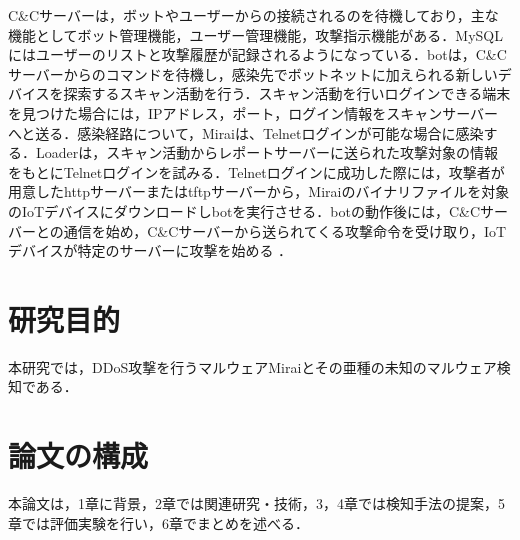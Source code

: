C\&Cサーバーは，ボットやユーザーからの接続されるのを待機しており，主な機能としてボット管理機能，ユーザー管理機能，攻撃指示機能がある．MySQLにはユーザーのリストと攻撃履歴が記録されるようになっている．botは，C\&Cサーバーからのコマンドを待機し，感染先でボットネットに加えられる新しいデバイスを探索するスキャン活動を行う．スキャン活動を行いログインできる端末を見つけた場合には，IPアドレス，ポート，ログイン情報をスキャンサーバーへと送る．感染経路について，Miraiは、Telnetログインが可能な場合に感染する．Loaderは，スキャン活動からレポートサーバーに送られた攻撃対象の情報をもとにTelnetログインを試みる．Telnetログインに成功した際には，攻撃者が用意したhttpサーバーまたはtftpサーバーから，Miraiのバイナリファイルを対象のIoTデバイスにダウンロードしbotを実行させる．botの動作後には，C\&Cサーバーとの通信を始め，C\&Cサーバーから送られてくる攻撃命令を受け取り，IoTデバイスが特定のサーバーに攻撃を始める
．

\section{研究目的}
本研究では，DDoS攻撃を行うマルウェアMiraiとその亜種の未知のマルウェア検知である．

\section{論文の構成}
本論文は，1章に背景，2章では関連研究・技術，3，4章では検知手法の提案，5章では評価実験を行い，6章でまとめを述べる．